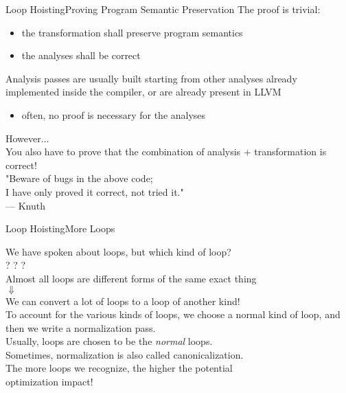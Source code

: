 \begin{frame}{Loop Hoisting}{Proving Program Semantic Preservation}
The \alert{proof} is trivial:

\begin{itemize}
\item the transformation shall preserve program semantics
\item the analyses shall be correct
\end{itemize}

Analysis passes are usually built starting from other analyses already
implemented inside the compiler, or are already present in LLVM
\begin{itemize}
\item often, no proof is necessary for the analyses
\end{itemize}

\vfill
\begin{center}
\alert{However...}\\
\smallskip
You also have to prove that the combination of analysis + transformation is correct!\\
\smallskip
"Beware of bugs in the above code;\\I have only proved it correct, not tried it."\\--- Knuth
\end{center}
\end{frame}


\begin{frame}{Loop Hoisting}{More Loops}
\begin{center} 
We have spoken about loops, but which kind of loop?\\
\medskip
{}? ? ?\\

\bigskip
Almost all loops are different forms of the \alert{same exact thing}\\
$\Downarrow$\\
We can convert a lot of loops to a loop of another kind!\\

\bigskip
To account for the various kinds of loops, we choose a \alert{normal}
kind of loop, and then we write a \alert{normalization} pass.\\
\smallskip
{\footnotesize
Usually,  loops are chosen to be the \emph{normal} loops.\\
\vspace{-1mm}
Sometimes, normalization is also called \alert{canonicalization}.}\\

\bigskip
The more loops we recognize, the higher the potential\\
\alert{optimization impact}!
\end{center}
\end{frame}


